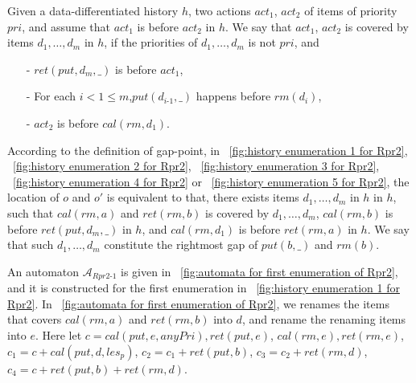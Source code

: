 Given a data-differentiated history $h$, two actions $\textit{act}_1$, $\textit{act}_2$ of items of priority $\textit{pri}$, and assume that $\textit{act}_1$ is before $\textit{act}_2$ in $h$. We say that $\textit{act}_1$, $\textit{act}_2$ is covered by items $d_1,\ldots,d_m$ in $h$, if the priorities of $d_1,\ldots,d_m$ is not $\textit{pri}$, and

\begin{itemize}
\setlength{\itemsep}{0.5pt}
\item[-] $\textit{ret}(\textit{put},d_m,\_)$ is before $\textit{act}_1$,

\item[-] For each $i < 1 \leq m$,$\textit{put}(d_{\textit{i-1}},\_)$ happens before $\textit{rm}(d_i)$,

\item[-] $\textit{act}_2$ is before $\textit{cal}(\textit{rm},d_1)$.
\end{itemize}

According to the definition of gap-point, in \figurename~\ref{fig:history enumeration 1 for Rpr2}, \figurename~\ref{fig:history enumeration 2 for Rpr2}, \figurename~\ref{fig:history enumeration 3 for Rpr2}, \figurename~\ref{fig:history enumeration 4 for Rpr2} or \figurename~\ref{fig:history enumeration 5 for Rpr2}, the location of $o$ and $o'$ is equivalent to that, there exists items $d_1,\ldots,d_m$ in $h$ in $h$, such that $\textit{cal}(\textit{rm},a)$ and $\textit{ret}(\textit{rm},b)$ is covered by $d_1,\ldots,d_m$, $\textit{cal}(\textit{rm},b)$ is before $\textit{ret}(\textit{put},d_m,\_)$ in $h$, and $\textit{cal}(\textit{rm},d_1)$ is before $\textit{ret}(\textit{rm},a)$ in $h$. We say that such $d_1,\ldots,d_m$ constitute the rightmost gap of $\textit{put}(b,\_)$ and $\textit{rm}(b)$.

An automaton $\mathcal{A}_{\textit{Rpr2-1}}$ is given in \figurename~\ref{fig:automata for first enumeration of Rpr2}, and it is constructed for the first enumeration in \figurename~\ref{fig:history enumeration 1 for Rpr2}. In \figurename~\ref{fig:automata for first enumeration of Rpr2}, we renames the items that covers $\textit{cal}(\textit{rm},a)$ and $\textit{ret}(\textit{rm},b)$ into $d$, and rename the renaming items into $e$. Here let $c = \textit{cal}(\textit{put},e,\textit{anyPri}),\textit{ret}(\textit{put},e)$, $\textit{cal}(\textit{rm},e), \textit{ret}(\textit{rm},e)$, $c_1 = c + \textit{cal}(\textit{put},d,\textit{les}_p)$, $c_2 = c_1 + \textit{ret}(\textit{put},b)$, $c_3 = c_2 + \textit{ret}(\textit{rm},d)$, $c_4 = c + \textit{ret}(\textit{put},b) + \textit{ret}(\textit{rm},d)$.

